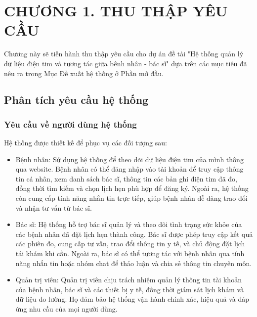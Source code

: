
\section*{CHƯƠNG 1. THU THẬP YÊU CẦU}
\setcounter{section}{1}
\setcounter{subsection}{0} %
\setcounter{table}{0} %
\setcounter{figure}{0} %
Chương này sẽ tiến hành thu thập yêu cầu cho dự án đề tài "Hệ thống quản lý dữ liệu điện tim và tương tác giữa bênh nhân - bác sĩ"
dựa trên các mục tiêu đã nêu ra trong Mục Đề xuất hệ thống ở Phần mở đầu.

\subsection{Phân tích yêu cầu hệ thống}
\subsubsection{Yêu cầu về người dùng hệ thống}
Hệ thống được thiết kế để phục vụ các đối tượng sau:
\begin{adjustwidth}{1.5em}{}
\begin{itemize}
    \item Bệnh nhân: Sử dụng hệ thống để theo dõi dữ liệu điện tim của mình thông qua website. 
    Bệnh nhân có thể đăng nhập vào tài khoản để truy cập thông tin cá nhân, xem danh sách bác sĩ, thông tin các bản ghi điện tim đã đo, đồng thời tìm kiếm và chọn lịch hẹn phù hợp để đăng ký.
    Ngoài ra, hệ thống còn cung cấp tính năng nhắn tin trực tiếp, giúp bệnh nhân dễ dàng trao đổi và nhận tư vấn từ bác sĩ.
    
    \item Bác sĩ: Hệ thống hỗ trợ bác sĩ quản lý và theo dõi tình trạng sức khỏe của các bệnh nhân đã đặt lịch hẹn thành công.
    Bác sĩ được phép truy cập kết quả các phiên đo, cung cấp tư vấn, trao đổi thông tin y tế, và chủ động đặt lịch tái khám khi cần.
    Ngoài ra, bác sĩ có thể tương tác với bệnh nhân qua tính năng nhắn tin hoặc nhóm chat để thảo luận và chia sẻ thông tin chuyên môn.
    
    \item Quản trị viên: Quản trị viên chịu trách nhiệm quản lý thông tin tài khoản của bệnh nhân, bác sĩ và các thiết bị y tế, đồng thời giám sát lịch khám và dữ liệu đo lường.
    Họ đảm bảo hệ thống vận hành chính xác, hiệu quả và đáp ứng nhu cầu của mọi người dùng.

\end{itemize}
\end{adjustwidth}

